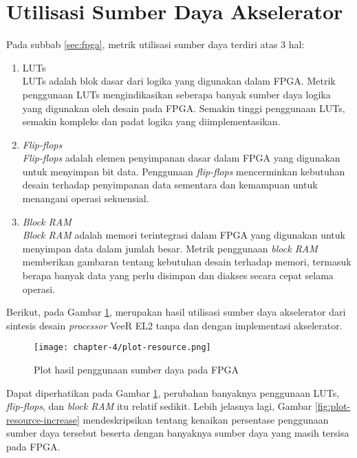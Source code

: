 \section{Utilisasi Sumber Daya Akselerator}

Pada subbab \ref{sec:fpga}, metrik utilisasi sumber daya terdiri atas 3 hal:

\begin{enumerate}
	\item \acf{LUTs}\\
	      \ac{LUTs} adalah blok dasar dari logika yang digunakan dalam \ac{FPGA}. Metrik penggunaan \ac{LUTs} mengindikasikan seberapa banyak sumber daya logika yang digunakan oleh desain pada \ac{FPGA}. Semakin tinggi penggunaan \ac{LUTs}, semakin kompleks dan padat logika yang diimplementasikan.
	\item \textit{Flip-flops}\\
	      \textit{Flip-flops} adalah elemen penyimpanan dasar dalam \ac{FPGA} yang digunakan untuk menyimpan bit data. Penggunaan \textit{flip-flops} mencerminkan kebutuhan desain terhadap penyimpanan data sementara dan kemampuan untuk menangani operasi sekuensial.
	\item \textit{Block \ac{RAM}}\\
	      \textit{Block \ac{RAM}} adalah memori terintegrasi dalam \ac{FPGA} yang digunakan untuk menyimpan data dalam jumlah besar. Metrik penggunaan \textit{block \ac{RAM}} memberikan gambaran tentang kebutuhan desain terhadap memori, termasuk berapa banyak data yang perlu disimpan dan diakses secara cepat selama operasi.
\end{enumerate}

Berikut, pada Gambar \ref{fig:plot-resource}, merupakan hasil utilisasi sumber daya akselerator dari sintesis desain \textit{processor} VeeR EL2 tanpa dan dengan implementasi akselerator.

\begin{figure}[h]
	\centering
	\texttt{[image: chapter-4/plot-resource.png]}
	\caption{Plot hasil penggunaan sumber daya pada \ac{FPGA}}
	\label{fig:plot-resource}
\end{figure}

Dapat diperhatikan pada Gambar \ref{fig:plot-resource}, perubahan banyaknya penggunaan \ac{LUTs}, \textit{flip-flops}, dan \textit{block \ac{RAM}} itu relatif sedikit. Lebih jelasnya lagi, Gambar \ref{fig:plot-resource-increase} mendeskripsikan tentang kenaikan persentase penggunaan sumber daya tersebut beserta dengan banyaknya sumber daya yang masih tersisa pada \ac{FPGA}.

